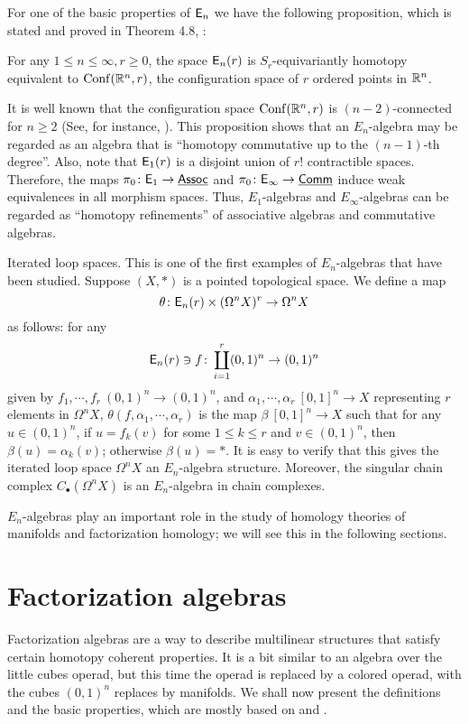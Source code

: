 \documentclass[twoside]{article}
\begin{document}
For one of the basic properties of $\mathsf{E}_n$ we have the following proposition,
which is stated and proved in Theorem 4.8, \cite{May72}:

\begin{proposition}
For any $1\le n\le\infty,r\ge 0$, the space $\mathsf{E}_n(r)$ is $S_r$-equivariantly
homotopy equivalent to $\operatorname{Conf}(\mathbb{R}^n,r)$, the configuration space of $r$ ordered points in $\mathbb{R}^n$.
\end{proposition}

It is well known that the configuration space $\operatorname{Conf}(\mathbb{R}^n,r)$ is 
$(n-2)$-connected for $n\ge 2$ (See, for instance, \cite{FN62}).
This proposition shows that an $E_n$-algebra may be regarded as an algebra
that is ``homotopy commutative up to the $(n-1)$-th degree''. Also, note that
$\mathsf{E}_1(r)$ is a disjoint union of $r!$ contractible spaces.
Therefore, the maps $\pi_0\colon\mathsf{E}_1\to\underline{\mathsf{Assoc}}$ and $\pi_0\colon\mathsf{E}_\infty\to\underline{\mathsf{Comm}}$ induce
weak equivalences in all morphism spaces. Thus, $E_1$-algebras
and $E_\infty$-algebras can be regarded as ``homotopy refinements''
of associative algebras and commutative algebras.

\begin{example}
Iterated loop spaces. This is one of the first examples of $E_n$-algebras
that have been studied. Suppose $(X,*)$ is a pointed topological space.
We define a map \[\theta\colon\mathsf{E}_n(r)\times(\Omega^nX)^r\to\Omega^nX\] as follows:
for any \[\mathsf{E}_n(r)\ni f\colon\coprod_{i=1}^r(0,1)^n\to(0,1)^n\] given by 
$f_1,\cdots,f_r\:(0,1)^n\to(0,1)^n$, and $\alpha_1,\cdots,\alpha_r\:[0,1]^n\to X$
representing $r$ elements in $\Omega^nX$, $\theta(f,\alpha_1,\cdots,\alpha_r)$
is the map $\beta\:[0,1]^n\to X$ such that for any $u\in(0,1)^n$, if $u=f_k(v)$
for some $1\le k\le r$ and $v\in(0,1)^n$, then $\beta(u)=\alpha_k(v)$;
otherwise $\beta(u)=*$. It is easy to verify that this gives the iterated
loop space $\Omega^nX$ an $E_n$-algebra structure. Moreover, the singular chain
complex $C_\bullet(\Omega^nX)$ is an $E_n$-algebra in chain complexes.
\end{example}

$E_n$-algebras play an important role in the study of homology theories
of manifolds and factorization homology; we will see this in the following 
sections.

\section{Factorization algebras}

Factorization algebras are a way to describe multilinear structures 
that satisfy certain homotopy coherent properties. It is a bit similar to
an algebra over the little cubes operad, but this time the operad is replaced
by a colored operad, with the cubes $(0,1)^n$ replaces by manifolds.
We shall now present the definitions and the basic properties,
which are mostly based on \cite{CG16} and \cite{Gin13}.
\end{document}
